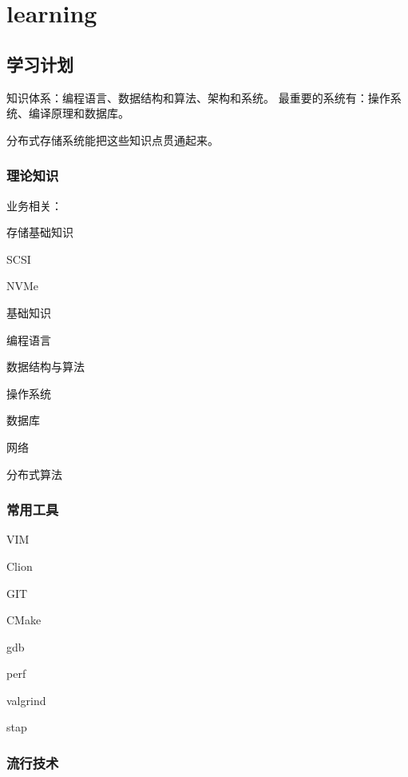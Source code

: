 \chapter{learning}

\section{学习计划}

知识体系：编程语言、数据结构和算法、架构和系统。
最重要的系统有：操作系统、编译原理和数据库。

分布式存储系统能把这些知识点贯通起来。

\subsection{理论知识}

业务相关：
\begin{enumbox}
\item 存储基础知识
\item SCSI
\item NVMe
\end{enumbox}

基础知识
\begin{enumbox}
\item 编程语言
\item 数据结构与算法
\item 操作系统
\item 数据库
\item 网络
\item 分布式算法
\end{enumbox}

\subsection{常用工具}

\begin{enumbox}
\item VIM
\item Clion
\item GIT
\item CMake
\item gdb
\item perf
\item valgrind
\item stap
\end{enumbox}


\subsection{流行技术}

